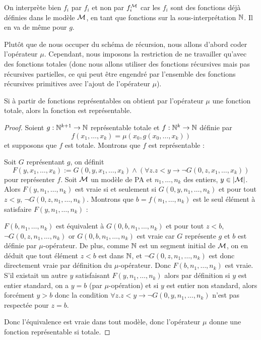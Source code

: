 \begin{rmk}
    On interprète bien $f_i$ par $f_i$ et non par $f_i^\mathcal M$ car les $f_i$ sont des fonctions déjà définies dans le modèle $\mathcal M$, en tant que fonctions sur la sous-interprétation $\mathbb{N}$. Il en va de même pour $g$.
\end{rmk}

Plutôt que de nous occuper du schéma de récursion, nous allons d'abord coder l'opérateur $\mu$. Cependant, nous imposons la restriction de ne travailler qu'avec des fonctions totales (donc nous allons utiliser des fonctions récursives mais pas récursives partielles, ce qui peut être engendré par l'ensemble des fonctions récursives primitives avec l'ajout de l'opérateur $\mu$).

\begin{lem}
    Si à partir de fonctions représentables on obtient par l'opérateur $\mu$ une fonction totale, alors la fonction est représentable.
\end{lem}

\begin{proof}
    Soient $g : \mathbb{N}^{k+1}\to\mathbb{N}$ représentable totale et $f : \mathbb{N}^k\to\mathbb{N}$ définie par $$f(x_1,\ldots,x_k) = \mu(x_0,g(x_0,\ldots,x_k))$$ et supposons que $f$ est totale. Montrons que $f$ est représentable :

    Soit $G$ représentant $g$, on définit $$F(y,x_1,\ldots,x_k) := G(0,y,x_1,\ldots,x_k)\land (\forall z. z<y \to \lnot G(0,z,x_1,\ldots,x_k))$$ pour représenter $f$. Soit $\mathcal M$ un modèle de PA et $n_1,\ldots,n_k$ des entiers, $y\in|\mathcal M|$. Alors $F(y,n_1,\ldots,n_k)$ est vraie si et seulement si $G(0,y,n_1,\ldots,n_k)$ et pour tout $z<y$, $\lnot G(0,z,n_1,\ldots,n_k)$. Montrons que $b = f(n_1,\ldots,n_k)$ est le seul élément à satisfaire $F(y,n_1,\ldots,n_k)$ :

    $F(b,n_1,\ldots,n_k)$ est équivalent à $G(0,b,n_1,\ldots,n_k)$ et pour tout $z<b$, $\lnot G(0,z,n_1,\ldots,n_k)$ or $G(0,b,n_1,\ldots,n_k)$ est vraie car $G$ représente $g$ et $b$ est définie par $\mu$-opérateur. De plus, comme $\mathbb{N}$ est un segment initial de $\mathcal M$, on en déduit que tout élément $z < b$ est dans $\mathbb{N}$, et $\lnot G(0,z,n_1,\ldots,n_k)$ est donc directement vraie par définition du $\mu$-opérateur. Donc $F(b,n_1,\ldots,n_k)$ est vraie. S'il existait un autre $y$ satisfaisant $F(y,n_1,\ldots,n_k)$ alors par définition si $y$ est entier standard, on a $y=b$ (par $\mu$-opération) et si $y$ est entier non standard, alors forcément $y>b$ donc la condition $\forall z. z<y \to \lnot G(0,y,n_1,\ldots,n_k)$ n'est pas respectée pour $z=b$.

    Donc l'équivalence est vraie dans tout modèle, donc l'opérateur $\mu$ donne une fonction représentable si totale.
\end{proof}

